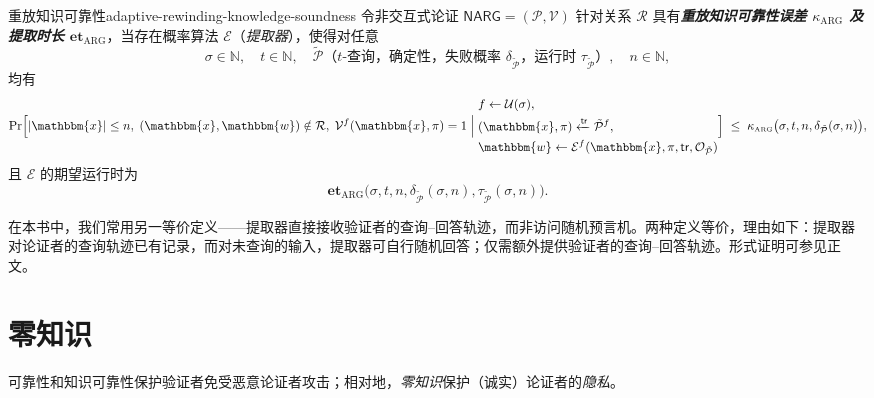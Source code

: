 \documentclass[american,singlepageview]{snargs-book-zh}
\newcommand{\defemph}[1]{\textbf{\emph{#1}}}
\newcommand{\Malicious}[1]{\tilde{#1}}
\newcommand{\BlackBox}[1]{\mathcal{O}_{#1}}
\newcommand{\SomeSize}[1]{|#1|}
\newcommand{\Naturals}{\mathbb{N}}
\newcommand{\Relation}{\mathcal{R}}
\newcommand{\Instance}{\mathbbm{x}}
\newcommand{\Witness}{\mathbbm{w}}
\newcommand{\InstanceSize}{n}
\newcommand{\ProtoProver}{P}
\newcommand{\ProtoVerifier}{V}
\newcommand{\ProtoExtractor}{E}
\newcommand{\ProtoKnowledgeError}{\kappa}
\newcommand{\ProtoKnowledgeTime}{\mathbf{et}}
\newcommand{\NARGSymbol}{\mathsf{NARG}}
\newcommand{\ARGSubscript}{\scriptscriptstyle\mathrm{ARG}}
\newcommand{\ARGFormat}[1]{\mathcal{#1}}
\newcommand{\ARGProver}{\ARGFormat{\ProtoProver}}
\newcommand{\ARGVerifier}{\ARGFormat{\ProtoVerifier}}
\newcommand{\ARGSystem}{(\ARGProver,\ARGVerifier)}
\newcommand{\ARGExtractor}{\ARGFormat{\ProtoExtractor}}
\newcommand{\ARGKnowledgeTime}{\ProtoKnowledgeTime_{\ARGSubscript}}
\newcommand{\ARGString}{\pi}
\newcommand{\ARGKnowledgeError}{\ProtoKnowledgeError_{\ARGSubscript}}
\newcommand{\ProverFailureProbability}[1]{\delta_{#1}}
\newcommand{\ProverRunningTime}[1]{\tau_{#1}}
\newcommand{\ROFunction}{f}
\newcommand{\ROQueryBound}{t}
\newcommand{\RODistribution}[1]{\mathcal{U}(#1)}
\newcommand{\ROOutputAndTrace}[4]{#4 \xleftarrow{#3} {#2}^{#1}}
\newcommand{\ROTrace}{\mathsf{tr}}
\newcommand{\ROOutputSize}{\sigma}
\begin{document}
\begin{ImportantDefinition}{重放知识可靠性}{adaptive-rewinding-knowledge-soundness}
令非交互式论证 $\NARGSymbol=\ARGSystem$ 针对关系 $\Relation$ 具有\defemph{重放知识可靠性误差 $\ARGKnowledgeError$ 及提取时长 $\ARGKnowledgeTime$}，当存在概率算法 $\ARGExtractor$（\emph{提取器}），使得对任意
\[
\ROOutputSize\in\Naturals,\quad
\ROQueryBound\in\Naturals,\quad
\Malicious{\ARGProver}\text{（$\ROQueryBound$-查询，确定性，失败概率 }\ProverFailureProbability{\Malicious{\ARGProver}}\text{，运行时 }\ProverRunningTime{\Malicious{\ARGProver}}\text{）},
\quad
\InstanceSize\in\Naturals,
\]
均有
\[
\Pr\Bigl[
  \SomeSize{\Instance}\le \InstanceSize,\;
  (\Instance,\Witness)\notin \Relation,\;
  \ARGVerifier^{\ROFunction}(\Instance,\ARGString)=1
  \;\Big|\;
  \begin{aligned}
    &\ROFunction\gets\RODistribution{\ROOutputSize},\\
    &\ROOutputAndTrace{\ROFunction}{\Malicious{\ARGProver}}{\ROTrace}{(\Instance,\ARGString)},\\
    &\Witness\gets\ARGExtractor^{\ROFunction}
       (\Instance,\ARGString,\ROTrace,\BlackBox{\Malicious{\ARGProver}})
  \end{aligned}
\Bigr]
\;\le\;
\ARGKnowledgeError\bigl(\ROOutputSize,\ROQueryBound,\InstanceSize,
\ProverFailureProbability{\Malicious{\ARGProver}}(\ROOutputSize,\InstanceSize)\bigr),
\]
且 $\ARGExtractor$ 的期望运行时为
\[
\ARGKnowledgeTime\bigl(\ROOutputSize,\ROQueryBound,\InstanceSize,
\ProverFailureProbability{\Malicious{\ARGProver}}(\ROOutputSize,\InstanceSize),
\ProverRunningTime{\Malicious{\ARGProver}}(\ROOutputSize,\InstanceSize)\bigr).
\]
\end{ImportantDefinition}

\begin{remark}[等价定义]
\label{remark:knowledge-equivalence}
在本书中，我们常用另一等价定义——提取器直接接收验证者的查询–回答轨迹，而非访问随机预言机。两种定义等价，理由如下：提取器对论证者的查询轨迹已有记录，而对未查询的输入，提取器可自行随机回答；仅需额外提供验证者的查询–回答轨迹。形式证明可参见正文。
\end{remark}

\section{零知识}
\label{section:narg-zero-knowledge}

可靠性和知识可靠性保护验证者免受恶意论证者攻击；相对地，\emph{零知识}保护（诚实）论证者的\emph{隐私}。
\end{document}
